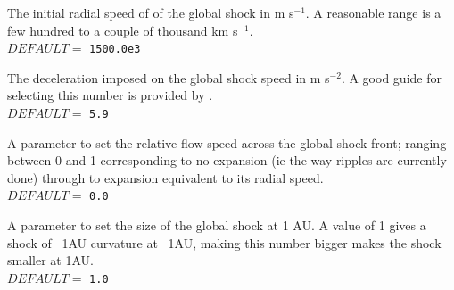 \documentclass[12pt,a4paper]{article}
\begin{document}
    \parbox[t]{\temptextwidth}{The initial radial speed of of the
                               global   shock in m s$^{-1}$. A reasonable
                               range is a few  hundred to a couple of
                               thousand km s$^{-1}$.
                               \\ $DEFAULT=$ {\tt 1500.0e3}}

  \vspace{0.5cm}

  \setlength{\temptextwidth}{\textwidth}   
  \addtolength{\temptextwidth}{-1.0\parindent}  
  
    \parbox[t]{\temptextwidth}{The deceleration imposed on the global 
                               shock speed  in m s$^{-2}$. A good guide
                               for selecting this number  is provided by 
                               \citet{gopalswamyetal01b}. \\
                               $DEFAULT=$ {\tt 5.9}}
      
  \vspace{0.5cm}

  \setlength{\temptextwidth}{\textwidth}  
  \addtolength{\temptextwidth}{-1.0\parindent}  
  
    \parbox[t]{\temptextwidth}{A parameter to set the relative flow speed
                               across the  global shock front; ranging
                               between 0 and 1  corresponding to no
                               expansion (ie the way ripples are 
                               currently done) through to expansion
                               equivalent to its  radial speed.     \\
                               $DEFAULT=$ {\tt 0.0}}

  \vspace{0.5cm}

  \setlength{\temptextwidth}{\textwidth}  
  \addtolength{\temptextwidth}{-1.0\parindent} 
    
    \parbox[t]{\temptextwidth}{A parameter to set the size of the global
                               shock at 1 AU. A value of 1 gives a shock 
                               of ~1AU curvature at ~1AU, making this number
                               bigger makes the shock smaller at 1AU. \\
                               $DEFAULT=$ {\tt 1.0}}

  \vspace{0.5cm}
 
\end{document}
